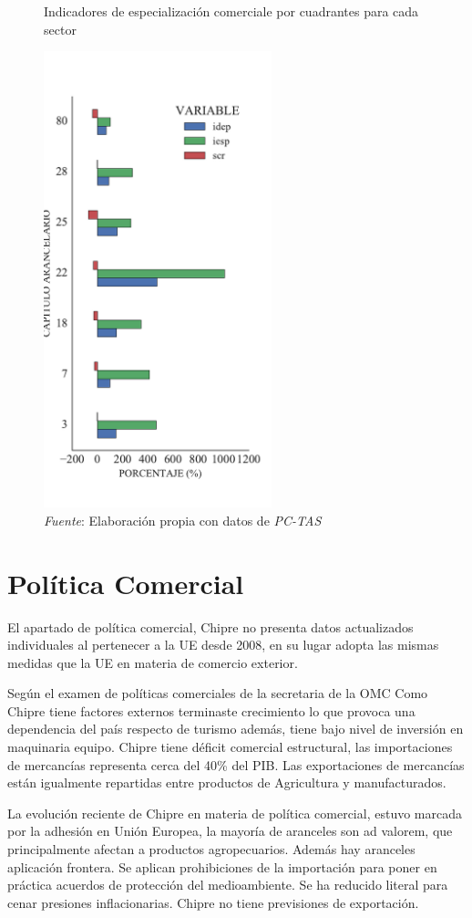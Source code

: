 \documentclass[a4paper,openright,12pt]{book}
\begin{document}
\begin{figure}[ht]
    \centering
    \caption{Indicadores de especialización comerciale por cuadrantes para cada sector}
    \includegraphics[width=250px]{esp_c4.pdf}
    \caption*{\textit{Fuente}: Elaboración propia con datos de \textit{PC-TAS}}
    \label{esp_c4}
\end{figure}

\chapter{Política Comercial}

El apartado de política comercial, Chipre no presenta datos actualizados individuales al pertenecer a la UE desde 2008, en su lugar adopta las mismas medidas que la UE en materia de comercio exterior.

Según el examen de políticas comerciales de la secretaria de la OMC Como Chipre tiene factores externos terminaste crecimiento lo que provoca una dependencia del país respecto de turismo además, tiene bajo nivel de inversión en maquinaria equipo. Chipre tiene déficit comercial estructural, las importaciones de mercancías representa cerca del 40\% del PIB. Las exportaciones de mercancías están igualmente repartidas entre productos de Agricultura y manufacturados.

La evolución reciente de Chipre en materia de política comercial, estuvo marcada por la adhesión en Unión Europea, la mayoría de aranceles son ad valorem, que principalmente afectan a productos agropecuarios. Además hay aranceles aplicación frontera. Se aplican prohibiciones de la importación para poner en práctica acuerdos de protección del medioambiente. Se ha reducido literal para cenar presiones inflacionarias. Chipre no tiene previsiones de exportación.
\end{document}
